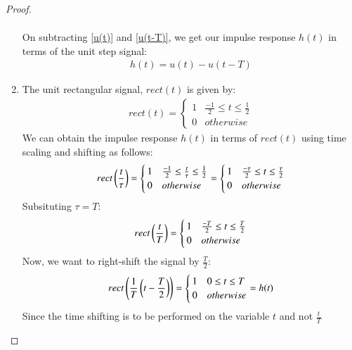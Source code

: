 \documentclass[journal,12pt,twocolumn]{IEEEtran}
\begin{document}
\begin{proof}
\begin{enumerate}
\begin{align}
\end{align}
On subtracting \eqref{u(t)} and \eqref{u(t-T)}, we get our impulse response $h(t)$ in terms of the unit step signal:
\begin{align}
    h(t) = u(t) - u(t-T)
\end{align}
\item The unit rectangular signal, $rect(t)$ is given by:
\begin{align}
    rect(t) = 
    \begin{cases}
    1 & \frac{-1}{2} \leq t \leq \frac{1}{2} \\
    0 & otherwise
    \end{cases}
    \label{rect}
\end{align}
We can obtain the impulse response $h(t)$ in terms of $rect(t)$ using time scaling and shifting as follows:
\begin{align}
    rect\left(\frac{t}{\tau}\right) = 
    \begin{cases}
    1 & \frac{-1}{2} \leq \frac{t}{\tau} \leq  \frac{1}{2}\\
    0 & otherwise
    \end{cases}
     = 
     \begin{cases}
     1 & \frac{-\tau}{2} \leq t \leq  \frac{\tau}{2}\\
    0 & otherwise
     \end{cases}
    \end{align}
    Subsituting $\tau = T$:
    \begin{align}
    rect\left(\frac{t}{T}\right) = 
    \begin{cases}
    1 & \frac{-T}{2} \leq t \leq \frac{T}{2}\\
    0 & otherwise
    \end{cases}
    \end{align}
    Now, we want to right-shift the signal by $\frac{T}{2}$:
    \begin{align}
    rect\left(\frac{1}{T}\left(t - \frac{T}{2}\right)\right) = 
    \begin{cases}
    1 &  0 \leq t \leq T\\
    0 & otherwise
    \end{cases}
     = h(t)
\end{align}
Since the time shifting is to be performed on the variable $t$ and not $\frac{t}{T}$\\


\end{enumerate}
\end{proof}
\end{document}
